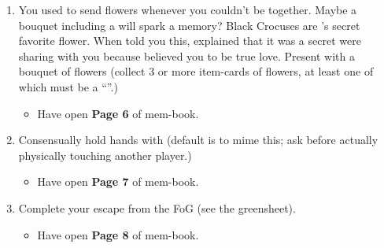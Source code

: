 \documentclass[green]{GL2020}
\begin{document}
\begin{enumerate}
\begin{itemize}
  \end{itemize}
  \item You used to send \cHeadScientist{} flowers whenever you couldn’t be together. Maybe a bouquet including a \iBlackCrocus{} will spark a memory? Black Crocuses are \cHeadScientist{}’s secret favorite flower. When \cHeadScientist{\they} told you this, \cHeadScientist{\they} explained that it was a secret \cHeadScientist{\they} were sharing with you because \cHeadScientist{} believed you to be \cHeadScientist{\their} true love. Present \cHeadScientist{} with a bouquet of flowers (collect 3 or more item-cards of flowers, at least one of which must be a ``\iBlackCrocus{}''.)
  \begin{itemize}
    \item Have \cHeadScientist{} open \textbf{Page 6} of \cHeadScientist{\their} mem-book.
  \end{itemize}
  \item Consensually hold hands with \cHeadScientist{} (default is to mime this; ask before actually physically touching another player.)
  \begin{itemize}
    \item Have \cHeadScientist{} open \textbf{Page 7} of \cHeadScientist{\their} mem-book.
  \end{itemize}
  \item Complete your escape from the FoG (see the greensheet).
  \begin{itemize}
    \item Have \cHeadScientist{} open \textbf{Page 8} of \cHeadScientist{\their} mem-book.
  \end{itemize}
\end{enumerate}
\end{document}

